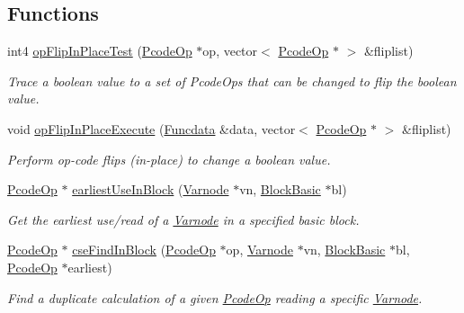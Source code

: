 \subsection*{Functions}
\begin{DoxyCompactItemize}
\item 
int4 \mbox{\hyperlink{funcdata_8hh_a297da0f17b1920199962c68f91daab29}{op\+Flip\+In\+Place\+Test}} (\mbox{\hyperlink{class_pcode_op}{Pcode\+Op}} $\ast$op, vector$<$ \mbox{\hyperlink{class_pcode_op}{Pcode\+Op}} $\ast$ $>$ \&fliplist)
\begin{DoxyCompactList}\small\item\em Trace a boolean value to a set of Pcode\+Ops that can be changed to flip the boolean value. \end{DoxyCompactList}\item 
void \mbox{\hyperlink{funcdata_8hh_a0a7a4ee0c419ed55c99f44d914284828}{op\+Flip\+In\+Place\+Execute}} (\mbox{\hyperlink{class_funcdata}{Funcdata}} \&data, vector$<$ \mbox{\hyperlink{class_pcode_op}{Pcode\+Op}} $\ast$ $>$ \&fliplist)
\begin{DoxyCompactList}\small\item\em Perform op-\/code flips (in-\/place) to change a boolean value. \end{DoxyCompactList}\item 
\mbox{\hyperlink{class_pcode_op}{Pcode\+Op}} $\ast$ \mbox{\hyperlink{funcdata_8hh_a953cc2ffb86fa99f4dc76a4829d5865c}{earliest\+Use\+In\+Block}} (\mbox{\hyperlink{class_varnode}{Varnode}} $\ast$vn, \mbox{\hyperlink{class_block_basic}{Block\+Basic}} $\ast$bl)
\begin{DoxyCompactList}\small\item\em Get the earliest use/read of a \mbox{\hyperlink{class_varnode}{Varnode}} in a specified basic block. \end{DoxyCompactList}\item 
\mbox{\hyperlink{class_pcode_op}{Pcode\+Op}} $\ast$ \mbox{\hyperlink{funcdata_8hh_a33643c2050e663261f9d07c4cab70868}{cse\+Find\+In\+Block}} (\mbox{\hyperlink{class_pcode_op}{Pcode\+Op}} $\ast$op, \mbox{\hyperlink{class_varnode}{Varnode}} $\ast$vn, \mbox{\hyperlink{class_block_basic}{Block\+Basic}} $\ast$bl, \mbox{\hyperlink{class_pcode_op}{Pcode\+Op}} $\ast$earliest)
\begin{DoxyCompactList}\small\item\em Find a duplicate calculation of a given \mbox{\hyperlink{class_pcode_op}{Pcode\+Op}} reading a specific \mbox{\hyperlink{class_varnode}{Varnode}}. \end{DoxyCompactList}\item 

\end{DoxyCompactItemize}
